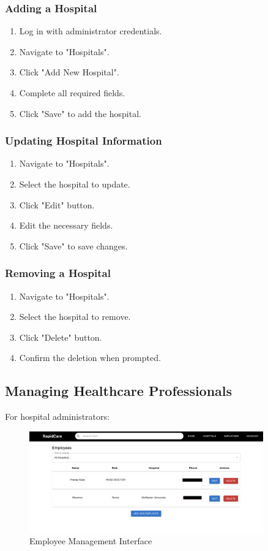 \documentclass[12pt, titlepage]{article}
\begin{document}
\subsubsection{Adding a Hospital}
\begin{enumerate}
\item Log in with administrator credentials.
\item Navigate to "Hospitals".
\item Click "Add New Hospital".
\item Complete all required fields.
\item Click "Save" to add the hospital.
\end{enumerate}

\subsubsection{Updating Hospital Information}
\begin{enumerate}
\item Navigate to "Hospitals".
\item Select the hospital to update.
\item Click "Edit" button.
\item Edit the necessary fields.
\item Click "Save" to save changes.
\end{enumerate}

\subsubsection{Removing a Hospital}
\begin{enumerate}
\item Navigate to "Hospitals".
\item Select the hospital to remove.
\item Click "Delete" button.
\item Confirm the deletion when prompted.
\end{enumerate}

\subsection{Managing Healthcare Professionals}
For hospital administrators:

\begin{figure}[H]
\centering
\includegraphics[width=0.9\textwidth]{employee.png}
\caption{Employee Management Interface}
\label{fig:Employee Management Interface}
\end{figure}
\end{document}

